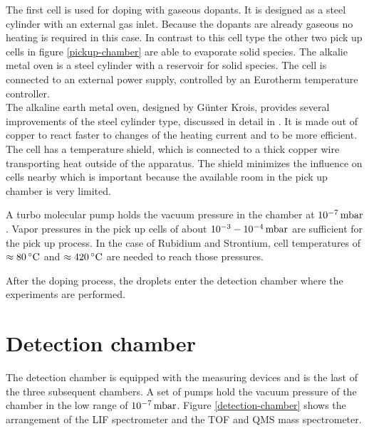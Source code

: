 \documentclass[parskip,12pt,headsepline,a4paper] {scrbook}
\begin{document}
The first cell is used for doping with gaseous dopants. It is designed as a steel cylinder with an external gas inlet. Because the dopants are already gaseous no heating is required in this case.
In contrast to this cell type the other two pick up cells in figure \ref{pickup-chamber} are able to evaporate solid species. The alkalie metal oven is a steel cylinder with a reservoir for solid species. The cell is connected to an external power supply, controlled by an Eurotherm temperature controller. \\
The alkaline earth metal oven, designed by G\"unter Krois, provides several improvements of the steel cylinder type, discussed in detail in \cite{krois}. It is made out of copper to react faster to changes of the heating current and to be more efficient. The cell has a temperature shield, which is connected to a thick copper wire transporting heat outside of the apparatus. The shield minimizes the influence on cells nearby which is important because the available room in the pick up chamber is very limited.

A turbo molecular pump holds the vacuum pressure in the chamber at $\unit[10^{-7}]{mbar}$. Vapor pressures in the pick up cells of about $\unit[10^{-3}-10^{-4}]{mbar}$ are sufficient for the pick up process. In the case of Rubidium and Strontium, cell temperatures of $\unit[\approx 80]{^\circ C}$ and $\unit[\approx 420]{^\circ C}$ are needed to reach those pressures.

After the doping process, the droplets enter the detection chamber where the experiments are performed.


\section{Detection chamber}
\vspace{-1\baselineskip}
The detection chamber is equipped with the measuring devices and is the last of the three subsequent chambers. A set of pumps hold the vacuum pressure of the chamber in the low range of $\unit[10^{-7}]{mbar}$. Figure \ref{detection-chamber} shows the arrangement of the LIF spectrometer and the TOF and QMS mass spectrometer.
\end{document}
